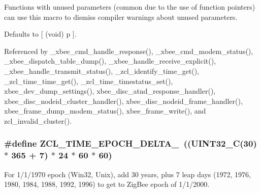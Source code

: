 Functions with unused parameters (common due to the use of function pointers) can use this macro to dismiss compiler warnings about unused parameters. 

Defaults to \mbox{[} (void) p \mbox{]}. 

Referenced by \-\_\-xbee\-\_\-cmd\-\_\-handle\-\_\-response(), \-\_\-xbee\-\_\-cmd\-\_\-modem\-\_\-status(), \-\_\-xbee\-\_\-dispatch\-\_\-table\-\_\-dump(), \-\_\-xbee\-\_\-handle\-\_\-receive\-\_\-explicit(), \-\_\-xbee\-\_\-handle\-\_\-transmit\-\_\-status(), \-\_\-zcl\-\_\-identify\-\_\-time\-\_\-get(), \-\_\-zcl\-\_\-time\-\_\-time\-\_\-get(), \-\_\-zcl\-\_\-time\-\_\-timestatus\-\_\-set(), xbee\-\_\-dev\-\_\-dump\-\_\-settings(), xbee\-\_\-disc\-\_\-atnd\-\_\-response\-\_\-handler(), xbee\-\_\-disc\-\_\-nodeid\-\_\-cluster\-\_\-handler(), xbee\-\_\-disc\-\_\-nodeid\-\_\-frame\-\_\-handler(), xbee\-\_\-frame\-\_\-dump\-\_\-modem\-\_\-status(), xbee\-\_\-frame\-\_\-write(), and zcl\-\_\-invalid\-\_\-cluster().

\hypertarget{group__hal_ga735b0974380a73e9d7a12a1f199a5921}{
\subsubsection[{Z\-C\-L\-\_\-\-T\-I\-M\-E\-\_\-\-E\-P\-O\-C\-H\-\_\-\-D\-E\-L\-T\-A\-\_\-1970}]{\setlength{\rightskip}{0pt plus 5cm}\#define Z\-C\-L\-\_\-\-T\-I\-M\-E\-\_\-\-E\-P\-O\-C\-H\-\_\-\-D\-E\-L\-T\-A\-\_~((U\-I\-N\-T32\-\_\-\-C(30) $\ast$ 365 + 7) $\ast$ 24 $\ast$ 60 $\ast$ 60)}}\label{group__hal_ga735b0974380a73e9d7a12a1f199a5921}


For 1/1/1970 epoch (Win32, Unix), add 30 years, plus 7 leap days (1972, 1976, 1980, 1984, 1988, 1992, 1996) to get to Zig\-Bee epoch of 1/1/2000. 

